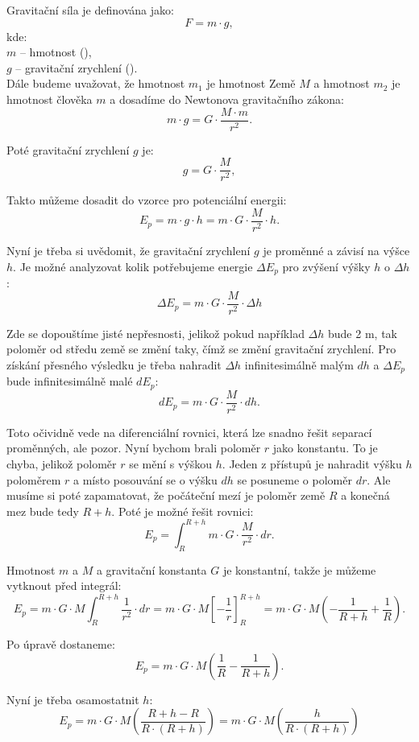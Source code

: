 \documentclass{article}
\begin{document}
Gravitační síla je definována jako:
$$
    F = m \cdot g,
$$
kde:\\
$m$ -- hmotnost (\ueqKG),\\
$g$ -- gravitační zrychlení (\ueqMandSinvsq).\\

Dále budeme uvažovat, že hmotnost $m_1$ je hmotnost Země $M$ a hmotnost $m_2$ je hmotnost člověka $m$ a dosadíme do Newtonova gravitačního zákona:
$$
    m \cdot g = G \cdot \frac{M \cdot m}{r^2}.
$$

Poté gravitační zrychlení $g$ je:
$$
    g = G \cdot \frac{M}{r^2},
$$

Takto můžeme dosadit do vzorce pro potenciální energii:
$$
    E_p = m \cdot g \cdot h = m \cdot G \cdot \frac{M}{r^2} \cdot h.
$$

Nyní je třeba si uvědomit, že gravitační zrychlení $g$ je proměnné a závisí na výšce $h$. Je možné analyzovat kolik potřebujeme energie $\Delta E_p$ pro zvýšení výšky $h$ o $\Delta h$:
$$
    \Delta E_p = m \cdot G \cdot \frac{M}{r^2} \cdot \Delta h
$$

Zde se dopouštíme jisté nepřesnosti, jelikož pokud například $\Delta h$ bude 2 m, tak poloměr od středu země se změní taky, čímž se změní gravitační zrychlení. Pro získání přesného výsledku je třeba nahradit $\Delta h$ infinitesimálně malým $dh$ a $\Delta E_p$ bude infinitesimálně malé $dE_p$:
$$
    dE_p = m \cdot G \cdot \frac{M}{r^2} \cdot dh.
$$

Toto očividně vede na diferenciální rovnici, která lze snadno řešit separací proměnných, ale pozor. Nyní bychom brali poloměr $r$ jako konstantu. To je chyba, jelikož poloměr $r$ se mění s výškou $h$. Jeden z přístupů je nahradit výšku $h$ poloměrem $r$ a místo posouvání se o výšku $dh$ se posuneme o poloměr $dr$. Ale musíme si poté zapamatovat, že počáteční mezí je poloměr země $R$ a konečná mez bude tedy $R + h$. Poté je možné řešit rovnici:
$$
    E_p = \int_{R}^{R + h} m \cdot G \cdot \frac{M}{r^2} \cdot dr.
$$

Hmotnost $m$ a $M$ a gravitační konstanta $G$ je konstantní, takže je můžeme vytknout před integrál:
$$
    E_p = m \cdot G \cdot M \int_{R}^{R + h} \frac{1}{r^2} \cdot dr = m \cdot G \cdot M \left[ - \frac{1}{r} \right]_{R}^{R + h} = m \cdot G \cdot M \left( - \frac{1}{R + h} + \frac{1}{R} \right).
$$

Po úpravě dostaneme:
$$
    E_p = m \cdot G \cdot M \left( \frac{1}{R} - \frac{1}{R + h} \right).
$$

Nyní je třeba osamostatnit $h$:
$$
    E_p = m \cdot G \cdot M \left( \frac{R + h - R}{R \cdot (R + h)} \right) = m \cdot G \cdot M \left( \frac{h}{R \cdot (R + h)} \right)
$$
\end{document}
